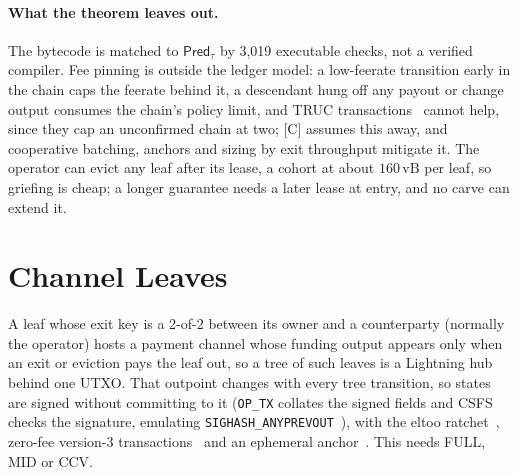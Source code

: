 \documentclass[runningheads]{llncs}
\newif\iffullversion
\newcommand{\lifted}[1]{\iffullversion\S\ref{#1}\else Appendix~\ref{#1}\fi}
\newcommand{\op}[1]{\texttt{OP\_#1}}
\newcommand{\vB}{\,\mathrm{vB}}
\newcommand{\Ftree}{\ensuremath{\mathcal{F}_{\mathsf{LT}}}}
\newcommand{\Pred}{\ensuremath{\mathsf{Pred}}}
\newcommand{\iface}[1]{\ensuremath{\mathsf{#1}}}
\begin{document}
\paragraph{What the theorem leaves out.} The bytecode is matched to
$\Pred_\tau$ by 3{,}019 executable checks, not a verified compiler. Fee
pinning is outside the ledger model: a low-feerate transition early in
the chain caps the feerate behind it, a descendant hung off any payout or
change output consumes the chain's policy limit, and TRUC
transactions~\cite{bip431} cannot help, since they cap an unconfirmed
chain at two; [C] assumes this away, and cooperative batching, anchors
and sizing by exit throughput mitigate it. The operator can evict any
leaf after its lease, a cohort at about $160\vB$ per leaf, so griefing is
cheap; a longer guarantee needs a later lease at entry, and no carve can
extend it.


\else

\fi

\iffullversion
\section{Channel Leaves as Composition}\label{sec:channels}
\else
\section{Channel Leaves}\label{sec:channels}
\fi

\iffullversion
A leaf whose exit key is a 2-of-2 between its owner and a counterparty
(normally the operator) can host a payment channel that exists only
off-chain and whose funding output materialises at the payout of the
\iface{EXIT} or \iface{EVICT} that removes the leaf, so a tree of such
leaves is a Lightning hub behind one UTXO. The channel protocol runs in
the $\Ftree$-hybrid model and treats the payout as its funding
transaction; \lifted{app:channels} gives scripts, state machine and costs.
The funding outpoint changes with every tree transition, so states are
signed without committing to it (\op{TX} collates the signed fields
behind a per-channel context, and CSFS checks the signature over the
hash, emulating \texttt{SIGHASH\_ANYPREVOUT}~\cite{bip118}), and the
channel uses the eltoo ratchet~\cite{eltoo,lnsymmetry} with zero-fee
version-3 transactions~\cite{bip431} and an ephemeral
anchor~\cite{ephemeralanchor}. This needs
\op{TX} and CSFS: FULL, MID, or CCV with the channel scripts in their own
outputs.
\else
A leaf whose exit key is a 2-of-2 between its owner and a counterparty
(normally the operator) hosts a payment channel whose funding output
appears only when an exit or eviction pays the leaf out, so a tree of
such leaves is a Lightning hub behind one UTXO. That outpoint changes
with every tree transition, so states are signed without committing to
it (\op{TX} collates the signed fields and CSFS checks the signature,
emulating \texttt{SIGHASH\_ANYPREVOUT}~\cite{bip118}), with the eltoo
ratchet~\cite{eltoo,lnsymmetry}, zero-fee version-3
transactions~\cite{bip431} and an ephemeral anchor~\cite{ephemeralanchor}. This needs FULL, MID or CCV.
\fi
\end{document}

